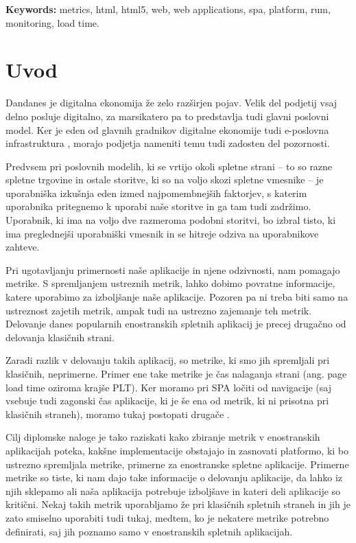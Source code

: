 \documentclass[a4paper, 12pt]{book}
\newcommand{\tkeywordsEn}{metrics, html, html5, web, web applications, spa, platform, rum, monitoring, load time}
\newcommand{\clearemptydoublepage}{\newpage{\pagestyle{empty}\cleardoublepage}}
\begin{document}
\bigskip

\noindent\textbf{Keywords:} \tkeywordsEn.
\clearemptydoublepage

\mainmatter
\setcounter{page}{1}
\pagestyle{fancy}

\chapter{Uvod}

Dandanes je digitalna ekonomija že zelo razširjen pojav. Velik del podjetij vsaj delno posluje digitalno, za marsikatero pa to predstavlja tudi glavni poslovni model. Ker je eden od glavnih gradnikov digitalne ekonomije tudi e-poslovna infrastruktura \cite{digital_econ}, morajo podjetja nameniti temu tudi zadosten del pozornosti.

Predvsem pri poslovnih modelih, ki se vrtijo okoli spletne strani – to so razne spletne trgovine in ostale storitve, ki so na voljo skozi spletne vmesnike – je uporabniška izkušnja eden izmed najpomembnejših faktorjev, s katerim uporabnika pritegnemo k uporabi naše storitve in ga tam tudi zadržimo. Uporabnik, ki ima na voljo dve razmeroma podobni storitvi, bo izbral tisto, ki ima preglednejši uporabniški vmesnik in se hitreje odziva na uporabnikove zahteve. 

Pri ugotavljanju primernosti naše aplikacije in njene odzivnosti, nam pomagajo metrike. S spremljanjem ustreznih metrik, lahko dobimo povratne informacije, katere uporabimo za izboljšanje naše aplikacije. Pozoren pa ni treba biti samo na ustreznost zajetih metrik, ampak tudi na ustrezno zajemanje teh metrik. Delovanje danes popularnih enostranskih spletnih aplikacij je precej drugačno od delovanja klasičnih strani.

Zaradi razlik v delovanju takih aplikacij, so metrike, ki smo jih spremljali pri klasičnih, neprimerne. Primer ene take metrike je čas nalaganja strani (ang. page load time oziroma krajše PLT). Ker moramo pri SPA ločiti  od  navigacije (saj  vsebuje tudi zagonski čas aplikacije, ki je še ena od metrik, ki ni prisotna pri klasičnih straneh), moramo tukaj postopati drugače \cite{hard_vs_soft_navigation} \cite{spa_presentation}.

Cilj diplomske naloge je tako raziskati kako zbiranje metrik v enostranskih aplikacijah poteka, kakšne implementacije obstajajo in zasnovati platformo, ki bo ustrezno spremljala metrike, primerne za enostranske spletne aplikacije. Primerne metrike so tiste, ki nam dajo take informacije o delovanju aplikacije, da lahko iz njih sklepamo ali naša aplikacija potrebuje izboljšave in kateri deli aplikacije so kritični. Nekaj takih metrik uporabljamo že pri klasičnih spletnih straneh in jih je zato smiselno uporabiti tudi tukaj, medtem, ko je nekatere metrike potrebno definirati, saj jih poznamo samo v enostranskih spletnih aplikacijah.
\end{document}
